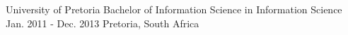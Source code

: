     \begin{cventries}
        \cventry{}{}{}{}{}

        \cventry
            {University of Pretoria}
            {Bachelor of Information Science in Information Science}
            {Jan. 2011 - Dec. 2013}
            {Pretoria, South Africa}
            {}
    \end{cventries}